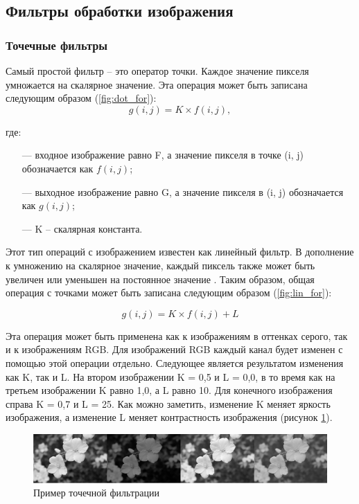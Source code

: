 \subsection{Фильтры обработки изображения}

\subsubsection{Точечные фильтры}

Самый простой фильтр -- это оператор точки. Каждое значение пикселя умножается на скалярное значение. Эта операция может быть записана следующим образом (\ref{fig:dot_for}):
\begin{equation}
	\label{fig:dot_for}
	g(i, j) = K \times f(i, j),
\end{equation}

где:
\begin{itemize}[leftmargin=1.6\parindent]
	\item[---] входное изображение равно F, а значение пикселя в точке (i, j) обозначается как $f(i, j)$;
	\item[---] выходное изображение равно G, а значение пикселя в (i, j) обозначается как $g(i, j)$;
	\item[---] K -- скалярная константа.
\end{itemize}

Этот тип операций с изображением известен как линейный фильтр. В дополнение к умножению на скалярное значение, каждый пиксель также может быть увеличен или уменьшен на постоянное значение \cite{imgProc3}. Таким образом, общая операция с точками может быть записана следующим образом (\ref{fig:lin_for}):

\begin{equation}
	\label{fig:lin_for}
	g(i, j) = K \times f(i, j) + L
\end{equation}

Эта операция может быть применена как к изображениям в оттенках серого, так и к изображениям RGB. Для изображений RGB каждый канал будет изменен с помощью этой операции отдельно. Следующее является результатом изменения как K, так и L. На втором изображении K = 0,5 и L = 0,0, в то время как на третьем изображении K равно 1,0, а L равно 10. Для конечного изображения справа K = 0,7 и L = 25. Как можно заметить, изменение K меняет яркость изображения, а изменение L меняет контрастность изображения (рисунок \ref{fig:spire01}).

\begin{figure}[hbtp]
	\centering
	\includegraphics[width=\textwidth]{img/image1.png}
	\caption{\label{fig:spire01} Пример точечной фильтрации}
\end{figure}

